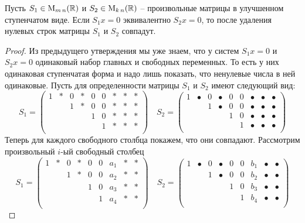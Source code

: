 \begin{claim}
Пусть $S_1\in\operatorname{M}_{m\,n}(\mathbb R)$ и $S_2\in\operatorname{M}_{k\,n}(\mathbb R)$ -- произвольные матрицы в улучшенном ступенчатом виде.
Если $S_1x = 0$ эквивалентно $S_2x=0$, то после удаления нулевых строк матрицы $S_1$ и $S_2$ совпадут.
\end{claim}
\begin{proof}
Из предыдущего утверждения мы уже знаем, что у систем $S_1x = 0$ и $S_2 x = 0$ одинаковый набор главных и свободных переменных.
То есть у них одинаковая ступенчатая форма и надо лишь показать, что ненулевые числа в ней одинаковые.
Пусть для определенности матрицы $S_1$  и $S_2$ имеют следующий вид:
\[
S_1 = 
\begin{pmatrix}
{1}&{*}&{0}&{*}&{0}&{0}&{*}&{*}&{*}\\
{}&{}&{1}&{*}&{0}&{0}&{*}&{*}&{*}\\
{}&{}&{}&{}&{1}&{0}&{*}&{*}&{*}\\
{}&{}&{}&{}&{}&{1}&{*}&{*}&{*}\\
\end{pmatrix}\quad
S_2 = 
\begin{pmatrix}
{1}&{\bullet}&{0}&{\bullet}&{0}&{0}&{\bullet}&{\bullet}&{\bullet}\\
{}&{}&{1}&{\bullet}&{0}&{0}&{\bullet}&{\bullet}&{\bullet}\\
{}&{}&{}&{}&{1}&{0}&{\bullet}&{\bullet}&{\bullet}\\
{}&{}&{}&{}&{}&{1}&{\bullet}&{\bullet}&{\bullet}\\
\end{pmatrix}
\]
Теперь для каждого свободного столбца покажем, что они совпадают.
Рассмотрим произвольный $i$-ый свободный столбец
\[
S_1 = 
\begin{pmatrix}
{1}&{*}&{0}&{*}&{0}&{0}&{a_1}&{*}&{*}\\
{}&{}&{1}&{*}&{0}&{0}&{a_2}&{*}&{*}\\
{}&{}&{}&{}&{1}&{0}&{a_3}&{*}&{*}\\
{}&{}&{}&{}&{}&{1}&{a_4}&{*}&{*}\\
\end{pmatrix}\quad
S_2 = 
\begin{pmatrix}
{1}&{\bullet}&{0}&{\bullet}&{0}&{0}&{b_1}&{\bullet}&{\bullet}\\
{}&{}&{1}&{\bullet}&{0}&{0}&{b_2}&{\bullet}&{\bullet}\\
{}&{}&{}&{}&{1}&{0}&{b_3}&{\bullet}&{\bullet}\\
{}&{}&{}&{}&{}&{1}&{b_4}&{\bullet}&{\bullet}\\

\end{pmatrix}\]
\end{proof}
